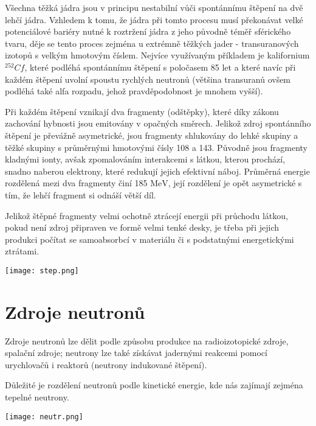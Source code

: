 \documentclass[../../main.tex]{subfiles}
\begin{document}
Všechna těžká jádra jsou v principu nestabilní vůči spontánnímu štěpení na dvě lehčí jádra. Vzhledem k tomu, že jádra při tomto procesu musí překonávat velké potenciálové bariéry nutné k roztržení jádra z jeho původně téměř sférického tvaru, děje se tento proces zejména u extrémně těžkých jader - transuranových izotopů s velkým hmotovým číslem. Nejvíce využívaným příkladem je kalifornium $^{252}Cf$, které podléhá spontánnímu štěpení s poločasem 85 let a které navíc při každém štěpení uvolní spoustu rychlých neutronů (většina transuranů ovšem podléhá také alfa rozpadu, jehož pravděpodobnost je mnohem vyšší).

Při každém štěpení vznikají dva fragmenty (odštěpky), které díky zákonu zachování hybnosti jsou emitovány v opačných směrech. Jelikož zdroj spontánního štěpení je převážně asymetrické, jsou fragmenty shlukovány do lehké skupiny a těžké skupiny s průměrnými hmotovými čísly 108 a 143. Původně jsou fragmenty kladnými ionty, avšak zpomalováním interakcemi s látkou, kterou prochází, snadno  naberou elektrony, které redukují jejich efektivní náboj. Průměrná energie rozdělená mezi dva fragmenty činí 185 $\mathrm{MeV}$, její rozdělení je opět asymetrické s tím, že lehčí fragment si odnáší větší díl. 

Jelikož štěpné fragmenty velmi ochotně ztrácejí energii při průchodu látkou, pokud není zdroj připraven ve formě velmi tenké desky, je třeba při jejich produkci počítat se samoabsorbcí v materiálu či s podstatnými energetickými ztrátami.  

 \begin{center}
	\texttt{[image: step.png]}
\end{center} 

\section{Zdroje neutronů}

Zdroje neutronů lze dělit podle způsobu produkce na radioizotopické zdroje, spalační zdroje; neutrony lze také získávat jadernými reakcemi pomocí urychlovačů i reaktorů (neutrony indukované štěpení).

Důležité je rozdělení neutronů podle kinetické energie, kde nás zajímají zejména tepelné neutrony.

 \begin{center}
	\texttt{[image: neutr.png]}
\end{center}
\end{document}
